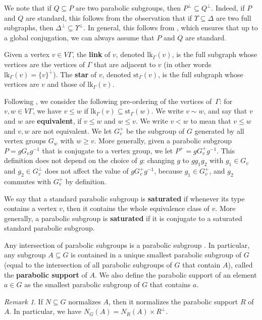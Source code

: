 \documentclass[a4paper,english,11pt]{article}
\theoremstyle{definition}
\theoremstyle{remark}
\newtheorem{Rq}[de]{Remark}
\newcommand{\st}{\mathrm{st}}
\newcommand{\lk}{\mathrm{lk}}
\newcommand{\deffont}[1]{\textbf{#1}}
\begin{document}
We note that if $Q\subseteq P$ are two parabolic subgroups, then $P^\perp\subseteq Q^\perp$. Indeed, if $P$ and $Q$ are standard, this follows from the observation that if $\Upsilon\subseteq\Delta$ are two full subgraphs, then $\Delta^\perp\subseteq\Upsilon^\perp$. In general, this follows from \cite[Lemma~3.7]{AM}, which ensures that up to a global conjugation, we can always assume that $P$ and $Q$ are standard.

Given a vertex $v\in V\Gamma$, the \deffont{link} of $v$, denoted $\lk_\Gamma(v)$, is the full subgraph whose vertices are the vertices of $\Gamma$ that are adjacent to $v$ (in other words $\lk_\Gamma(v)=\{v\}^\perp$). The \deffont{star} of $v$, denoted $\st_\Gamma(v)$, is the full subgraph whose vertices are $v$ and those of $\lk_\Gamma(v)$.

Following \cite[Section~2]{CV}, we consider the following pre-ordering of the vertices of~$\Gamma$: for $v,w\in V\Gamma$, we have $v\le w$ if $\lk_\Gamma(v)\subseteq\st_\Gamma(w)$. We write $v\sim w$, and say that $v$ and $w$ are \deffont{equivalent}, if $v\le w$ and $w\le v$. {We write $v<w$ to mean that $v\le w$ and $v,w$ are not equivalent.} We let $G_v^+$ be the subgroup of $G$ generated by all vertex groups $G_w$ with $w\ge v$. More generally, given a parabolic subgroup $P=gG_vg^{-1}$ that is conjugate to a vertex group, we let $P^+=gG_v^+g^{-1}$. This definition does not depend on the choice of $g$: changing $g$ to $gg_1g_2$ with $g_1\in G_v$ and $g_2\in G_v^\perp$ does not affect the value of $gG_v^+g^{-1}$, because $g_1\in G_v^+$, and $g_2$ commutes with $G_v^+$ by definition.

\label{de:saturated} 
We say that a standard parabolic subgroup is \deffont{saturated} if whenever its type contains a vertex $v$, then it contains the whole equivalence class of $v$. More generally, a parabolic subgroup is \deffont{saturated} if it is conjugate to a saturated standard parabolic subgroup.

Any intersection of parabolic subgroups is a parabolic subgroup \cite[Corollaries~3.6 and~3.18]{AM}. In particular, any subgroup $A\subseteq G$ is contained in a unique smallest parabolic subgroup of $G$ (equal to the intersection of all parabolic subgroups of $G$ that contain $A$), called the \deffont{parabolic support} of $A$. We also define the parabolic support of an element $a\in G$ as the smallest parabolic subgroup of $G$ that contains $a$. 

\begin{Rq}\label{Fact:Normalizer-support}
    If $N\subseteq G$ normalizes $A$, then it normalizes the parabolic support $R$ of $A$. In particular, we have $N_G(A)=N_R(A)\times R^\perp$.
\end{Rq}
\end{document}

